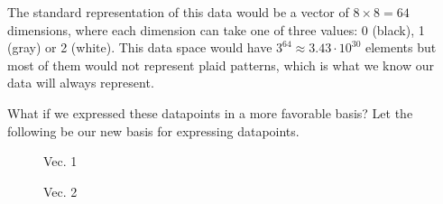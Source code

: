 \documentclass[12pt]{report}
\begin{document}
            The standard representation of this data would be a vector of $8 \times 8 = 64$ dimensions, where each dimension can take one of three values: 0 (black), 1 (gray) or 2 (white). This data space would have $3^64 \approx 3.43 \cdot 10^{30}$ elements but most of them would not represent plaid patterns, which is what we know our data will always represent.


            What if we expressed these datapoints in a more favorable basis? Let the following be our new basis for expressing datapoints.
            
            \begin{figure}[H]
                \centering
                \begin{minipage}{0.1\textwidth}
                    \centering
                    Vec. 1
                \end{minipage}
                \begin{minipage}{0.1\textwidth}
                    \centering
                    Vec. 2
                \end{minipage}
                \begin{minipage}{0.1\textwidth}
                    \centering
\end{minipage}
\end{figure}
\end{document}
